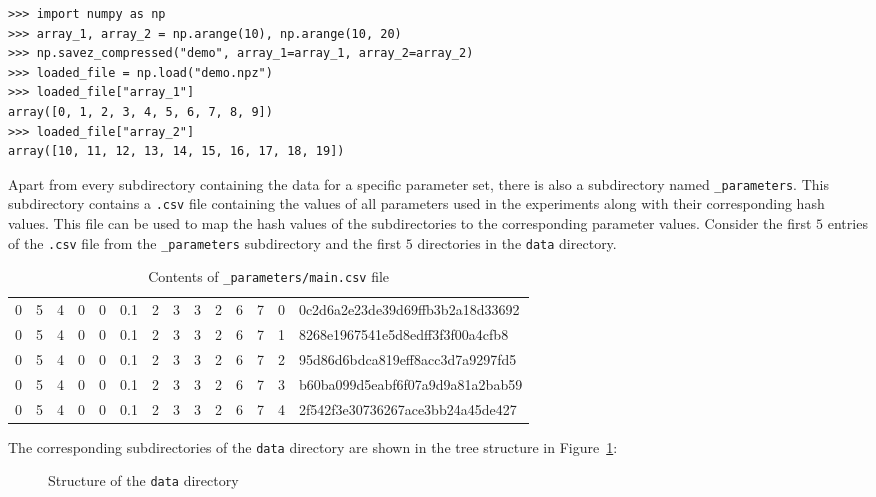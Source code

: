 \begin{lstlisting}[style=pystyle]
>>> import numpy as np
>>> array_1, array_2 = np.arange(10), np.arange(10, 20)
>>> np.savez_compressed("demo", array_1=array_1, array_2=array_2)
>>> loaded_file = np.load("demo.npz")
>>> loaded_file["array_1"]
array([0, 1, 2, 3, 4, 5, 6, 7, 8, 9])
>>> loaded_file["array_2"]
array([10, 11, 12, 13, 14, 15, 16, 17, 18, 19])

\end{lstlisting}

Apart from every subdirectory containing the data for a specific parameter set,
there is also a subdirectory named \lstinline{_parameters}.
This subdirectory contains a \lstinline{.csv} file containing the
values of all parameters used in the experiments along with their corresponding hash values.
This file can be used to map the hash values of the subdirectories to the
corresponding parameter values.
Consider the first \(5\) entries of the \lstinline{.csv} file
from the \lstinline{_parameters} subdirectory and the first
\(5\) directories in the \lstinline{data} directory.

\begin{table}[H]
    \centering
    \caption{Contents of \lstinline{_parameters/main.csv} file}
    \begin{tabular}{|cccccccccccccl|}
        \hline
        0 & 5 & 4 & 0 & 0 & 0.1 & 2 & 3 & 3 & 2 & 6 & 7 & 0 &
        0c2d6a2e23de39d69ffb3b2a18d33692 \\
        0 & 5 & 4 & 0 & 0 & 0.1 & 2 & 3 & 3 & 2 & 6 & 7 & 1 &
        8268e1967541e5d8edff3f3f00a4cfb8 \\
        0 & 5 & 4 & 0 & 0 & 0.1 & 2 & 3 & 3 & 2 & 6 & 7 & 2 &
        95d86d6bdca819eff8acc3d7a9297fd5 \\
        0 & 5 & 4 & 0 & 0 & 0.1 & 2 & 3 & 3 & 2 & 6 & 7 & 3 &
        b60ba099d5eabf6f07a9d9a81a2bab59 \\
        0 & 5 & 4 & 0 & 0 & 0.1 & 2 & 3 & 3 & 2 & 6 & 7 & 4 &
        2f542f3e30736267ace3bb24a45de427 \\
        \hline
    \end{tabular}
    \label{tab:parameters_csv}
\end{table}

The corresponding subdirectories of the \lstinline{data}
directory are shown in the tree structure in Figure~\ref{fig:data_directory}:

\begin{figure}[H]
    \caption{Structure of the \lstinline{data} directory}
    \label{fig:data_directory}
\end{figure}
    
